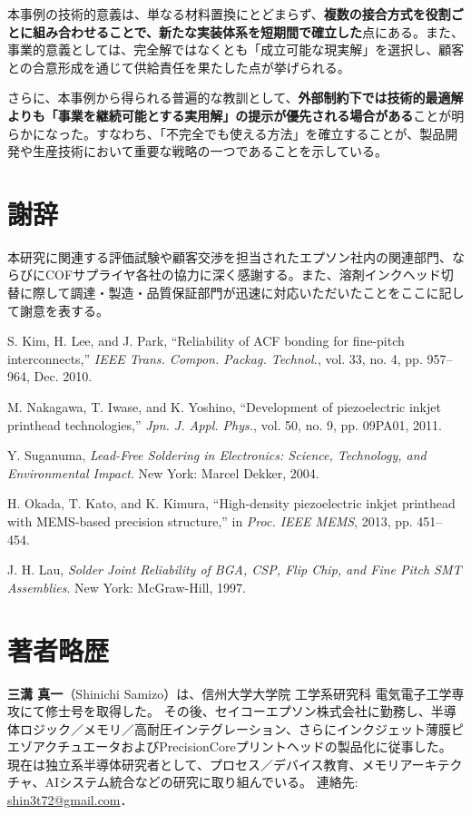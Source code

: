 \documentclass[conference]{IEEEtran}
\begin{document}
本事例の技術的意義は、単なる材料置換にとどまらず、\textbf{複数の接合方式を役割ごとに組み合わせることで、新たな実装体系を短期間で確立した}点にある。また、事業的意義としては、完全解ではなくとも「成立可能な現実解」を選択し、顧客との合意形成を通じて供給責任を果たした点が挙げられる。  

さらに、本事例から得られる普遍的な教訓として、\textbf{外部制約下では技術的最適解よりも「事業を継続可能とする実用解」の提示が優先される場合がある}ことが明らかになった。すなわち、「不完全でも使える方法」を確立することが、製品開発や生産技術において重要な戦略の一つであることを示している。

\section*{謝辞}
本研究に関連する評価試験や顧客交渉を担当されたエプソン社内の関連部門、ならびにCOFサプライヤ各社の協力に深く感謝する。また、溶剤インクヘッド切替に際して調達・製造・品質保証部門が迅速に対応いただいたことをここに記して謝意を表する。

\begin{thebibliography}{99}
S. Kim, H. Lee, and J. Park, “Reliability of ACF bonding for fine-pitch interconnects,” \textit{IEEE Trans. Compon. Packag. Technol.}, vol. 33, no. 4, pp. 957–964, Dec. 2010.

M. Nakagawa, T. Iwase, and K. Yoshino, “Development of piezoelectric inkjet printhead technologies,” \textit{Jpn. J. Appl. Phys.}, vol. 50, no. 9, pp. 09PA01, 2011.

Y. Suganuma, \textit{Lead-Free Soldering in Electronics: Science, Technology, and Environmental Impact}. New York: Marcel Dekker, 2004.

H. Okada, T. Kato, and K. Kimura, “High-density piezoelectric inkjet printhead with MEMS-based precision structure,” in \textit{Proc. IEEE MEMS}, 2013, pp. 451–454.

J. H. Lau, \textit{Solder Joint Reliability of BGA, CSP, Flip Chip, and Fine Pitch SMT Assemblies}. New York: McGraw-Hill, 1997.
\end{thebibliography}

\section*{著者略歴}
\textbf{三溝 真一}（Shinichi Samizo）は、信州大学大学院 工学系研究科 電気電子工学専攻にて修士号を取得した。  
その後、セイコーエプソン株式会社に勤務し、半導体ロジック／メモリ／高耐圧インテグレーション、さらにインクジェット薄膜ピエゾアクチュエータおよびPrecisionCoreプリントヘッドの製品化に従事した。  
現在は独立系半導体研究者として、プロセス／デバイス教育、メモリアーキテクチャ、AIシステム統合などの研究に取り組んでいる。  
連絡先: \href{mailto:shin3t72@gmail.com}{shin3t72@gmail.com}．
\end{document}
